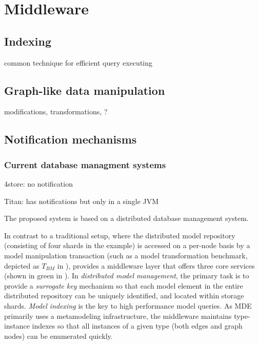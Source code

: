 \section{Middleware}
\label{sec:middleware}

\subsection{Indexing}

common technique for efficient query executing

\subsection{Graph-like data manipulation}

modifications, transformations, ?

\subsection{Notification mechanisms}


\subsubsection{Current database managment systems}

4store: no notification

Titan: has notifications but only in a single JVM

The proposed system is based on a distributed database management system.


In contrast to a traditional setup, where the distributed model repository (consisting of four shards in the example) is accessed on a per-node basis by a model manipulation transaction (such as a model transformation benchmark, depicted as $T_{BM}$ in ), \iqd{} provides a middleware layer that offers three core services (shown in green in ).
In \emph{distributed model management}, the primary task is to provide a \emph{surrogate key} mechanism so that each model element in the entire distributed repository can be uniquely identified, and located within storage shards.
\emph{Model indexing} is the key to high performance model queries. As MDE primarily uses a metamodeling infrastructure, the \iqd{} middleware maintains type-instance indexes so that all instances of a given type (both edges and graph nodes) can be enumerated quickly.

